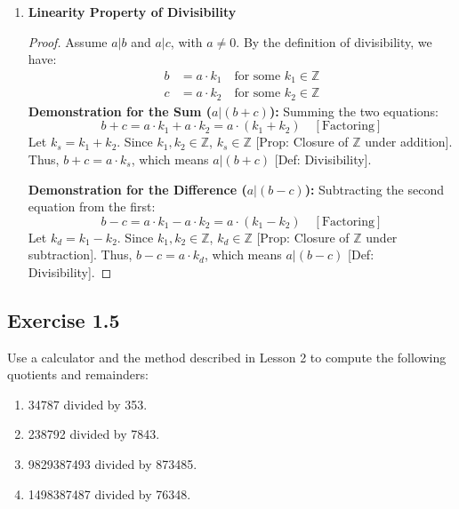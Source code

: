 \begin{enumerate}
    \item \textbf{Linearity Property of Divisibility}
    \begin{proof}
        Assume $a|b$ and $a|c$, with $a \ne 0$.
        By the definition of divisibility, we have:
        \begin{align*}
            b &= a \cdot k_1 \quad \text{for some } k_1 \in \mathbb{Z} \\
            c &= a \cdot k_2 \quad \text{for some } k_2 \in \mathbb{Z}
        \end{align*}
        \textbf{Demonstration for the Sum ($a|(b+c)$):}
        Summing the two equations:
        $$b+c = a \cdot k_1 + a \cdot k_2 = a \cdot (k_1 + k_2) \quad [\text{Factoring}]$$
        Let $k_s = k_1 + k_2$. Since $k_1, k_2 \in \mathbb{Z}$, $k_s \in \mathbb{Z}$ [Prop: Closure of $\mathbb{Z}$ under addition].
        Thus, $b+c = a \cdot k_s$, which means $a|(b+c)$ [Def: Divisibility].
        
        \textbf{Demonstration for the Difference ($a|(b-c)$):}
        Subtracting the second equation from the first:
        $$b-c = a \cdot k_1 - a \cdot k_2 = a \cdot (k_1 - k_2) \quad [\text{Factoring}]$$
        Let $k_d = k_1 - k_2$. Since $k_1, k_2 \in \mathbb{Z}$, $k_d \in \mathbb{Z}$ [Prop: Closure of $\mathbb{Z}$ under subtraction].
        Thus, $b-c = a \cdot k_d$, which means $a|(b-c)$ [Def: Divisibility].
    \end{proof}
\end{enumerate}

\newpage
\subsection*{Exercise 1.5}
Use a calculator and the method described in Lesson 2 to compute the following quotients and remainders:
\begin{enumerate}
    \item 34787 divided by 353.
    \item 238792 divided by 7843.
    \item 9829387493 divided by 873485.
    \item 1498387487 divided by 76348.
\end{enumerate}

